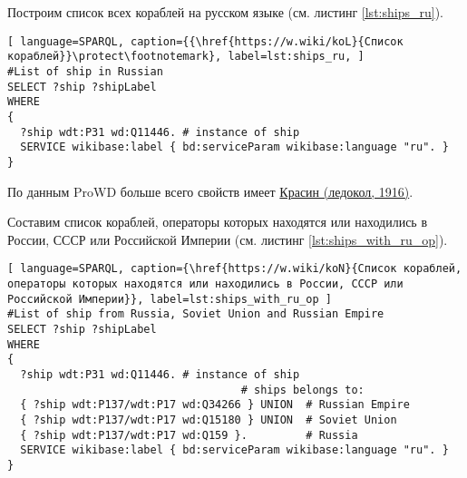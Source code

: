 Построим список всех кораблей на русском языке (см. листинг \ref{lst:ships_ru}).

\begin{lstlisting}[ language=SPARQL, caption={{\href{https://w.wiki/koL}{Список кораблей}}\protect\footnotemark}, label=lst:ships_ru, ]
#List of ship in Russian
SELECT ?ship ?shipLabel
WHERE
{
  ?ship wdt:P31 wd:Q11446. # instance of ship
  SERVICE wikibase:label { bd:serviceParam wikibase:language "ru". }
}
\end{lstlisting}

По данным ProWD больше всего свойств имеет \href{https://www.wikidata.org/wiki/Q281147}{Красин (ледокол, 1916)}\cite{ProWD_ru_ships}.

Составим список кораблей, операторы которых находятся или находились в России, СССР или Российской Империи (см. листинг \ref{lst:ships_with_ru_op}).

\begin{lstlisting}[ language=SPARQL, caption={\href{https://w.wiki/koN}{Cписок кораблей, операторы которых находятся или находились в России, СССР или Российской Империи}}, label=lst:ships_with_ru_op ]
#List of ship from Russia, Soviet Union and Russian Empire
SELECT ?ship ?shipLabel
WHERE
{
  ?ship wdt:P31 wd:Q11446. # instance of ship
                                    # ships belongs to:
  { ?ship wdt:P137/wdt:P17 wd:Q34266 } UNION  # Russian Empire
  { ?ship wdt:P137/wdt:P17 wd:Q15180 } UNION  # Soviet Union
  { ?ship wdt:P137/wdt:P17 wd:Q159 }.         # Russia
  SERVICE wikibase:label { bd:serviceParam wikibase:language "ru". }
}
\end{lstlisting}




